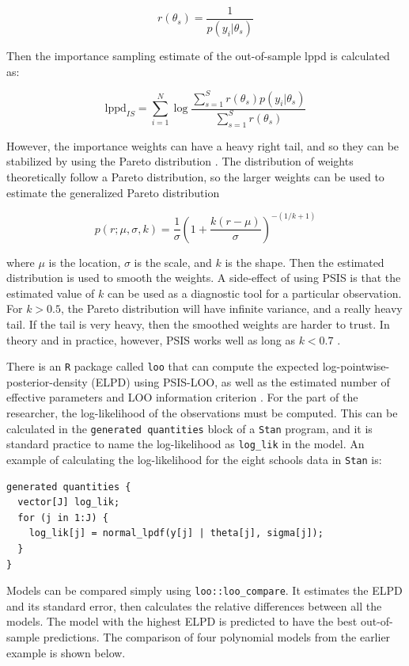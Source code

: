 \documentclass[11pt, oneside, openany]{scrbook}
\begin{document}
\[
r(\theta_s) = \frac{1}{p(y_i \vert \theta_s)}
\]

Then the importance sampling estimate of the out-of-sample lppd is calculated as:

\[
\mathrm{lppd}_{IS} = \sum_{i=1}^N\log \frac{\sum_{s=1}^S r(\theta_s) p(y_i \vert \theta_s)}{\sum_{s=1}^S r(\theta_s)}
\]

However, the importance weights can have a heavy right tail, and so they can be stabilized by using the Pareto distribution \citep{vehtari2015pareto}. The distribution of weights theoretically follow a Pareto distribution, so the larger weights can be used to estimate the generalized Pareto distribution

\[
p(r; \mu, \sigma, k) = \frac{1}{\sigma} \left(1 + \frac{k (r - \mu)}{\sigma}\right)^{-(1/k + 1)}
\]

where \(\mu\) is the location, \(\sigma\) is the scale, and \(k\) is the shape. Then the estimated distribution is used to smooth the weights. A side-effect of using PSIS is that the estimated value of \(k\) can be used as a diagnostic tool for a particular observation. For \(k>0.5\), the Pareto distribution will have infinite variance, and a really heavy tail. If the tail is very heavy, then the smoothed weights are harder to trust. In theory and in practice, however, PSIS works well as long as \(k < 0.7\) \citep{vehtari2015pareto}.

There is an \texttt{R} package called \texttt{loo} that can compute the expected log-pointwise-posterior-density (ELPD) using PSIS-LOO, as well as the estimated number of effective parameters and LOO information criterion \citep{R-loo}. For the part of the researcher, the log-likelihood of the observations must be computed. This can be calculated in the \texttt{generated\ quantities} block of a \texttt{Stan} program, and it is standard practice to name the log-likelihood as \texttt{log\_lik} in the model. An example of calculating the log-likelihood for the eight schools data in \texttt{Stan} is:


\begin{verbatim}
generated quantities {
  vector[J] log_lik;
  for (j in 1:J) {
    log_lik[j] = normal_lpdf(y[j] | theta[j], sigma[j]);
  }
}
\end{verbatim}


Models can be compared simply using \texttt{loo::loo\_compare}. It estimates the ELPD and its standard error, then calculates the relative differences between all the models. The model with the highest ELPD is predicted to have the best out-of-sample predictions. The comparison of four polynomial models from the earlier example is shown below.
\end{document}

